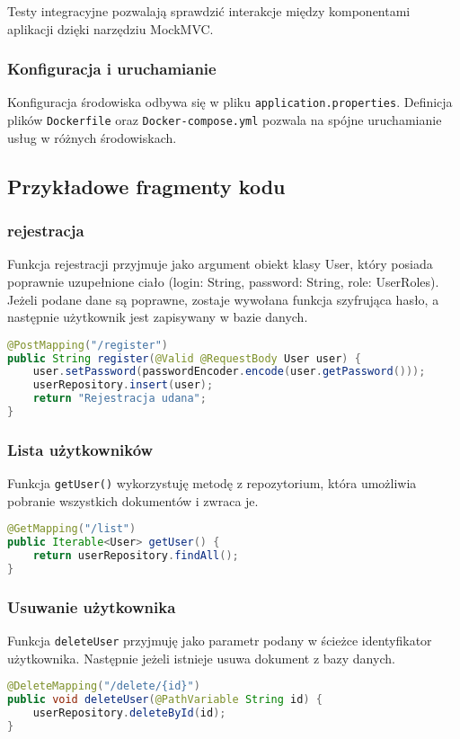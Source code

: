 Testy integracyjne pozwalają sprawdzić interakcje między komponentami aplikacji dzięki narzędziu MockMVC.
\subsubsection*{Konfiguracja i uruchamianie}
Konfiguracja środowiska odbywa się w pliku \texttt{application.properties}. Definicja plików \texttt{Dockerfile} oraz \texttt{Docker-compose.yml} pozwala na spójne uruchamianie usług w różnych środowiskach.
\subsection*{Przykładowe fragmenty kodu}
\subsubsection*{rejestracja}
Funkcja rejestracji przyjmuje jako argument obiekt klasy User, który posiada poprawnie uzupełnione ciało (login: String, password: String, role: UserRoles). Jeżeli podane dane są poprawne, zostaje wywołana funkcja szyfrująca hasło, a następnie użytkownik jest zapisywany w bazie danych.
\begin{lstlisting}[language={Java}, caption={Rejestracja użytkownika}, label={lst:java-register}]
@PostMapping("/register")
public String register(@Valid @RequestBody User user) {
	user.setPassword(passwordEncoder.encode(user.getPassword()));
	userRepository.insert(user);
	return "Rejestracja udana";
}
\end{lstlisting}
\subsubsection*{Lista użytkowników}
Funkcja \texttt{getUser()} wykorzystuję metodę z repozytorium, która umożliwia pobranie wszystkich dokumentów i zwraca je.
\begin{lstlisting}[language={Java}, caption={Lista użytkowników}, label={lst:java-list}]
@GetMapping("/list")
public Iterable<User> getUser() {
	return userRepository.findAll();
}
\end{lstlisting}
\subsubsection*{Usuwanie użytkownika}
Funkcja \texttt{deleteUser} przyjmuję jako parametr podany w ścieżce identyfikator użytkownika. Następnie jeżeli istnieje usuwa dokument z bazy danych.
\begin{lstlisting}[language={Java}, caption={Usuwanie użytkownika}, label={lst:java-delete}]
@DeleteMapping("/delete/{id}")
public void deleteUser(@PathVariable String id) {
	userRepository.deleteById(id);
}
\end{lstlisting}
